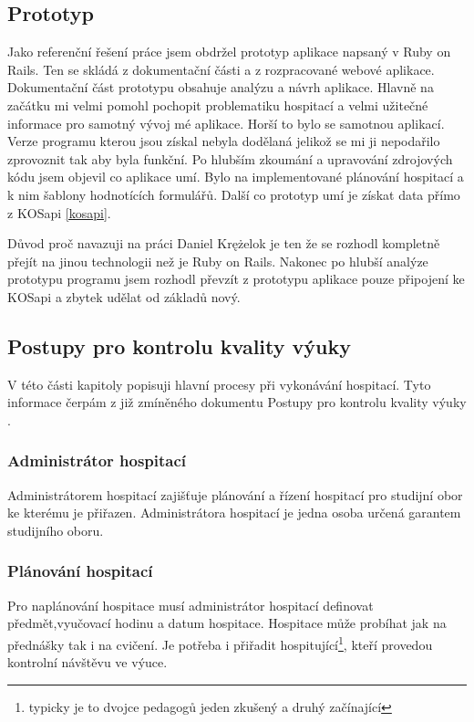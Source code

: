 \subsection{Prototyp}

Jako referenční řešení práce jsem obdržel prototyp aplikace napsaný v Ruby on Rails. Ten se skládá z dokumentační části a z rozpracované webové aplikace. Dokumentační část prototypu obsahuje analýzu a návrh aplikace. Hlavně na začátku mi velmi pomohl pochopit problematiku hospitací a velmi užitečné informace pro samotný vývoj mé aplikace. Horší to bylo se samotnou aplikací. Verze programu kterou jsou získal nebyla dodělaná jelikož se mi ji nepodařilo zprovoznit tak aby byla funkční. Po hlubším zkoumání a upravování zdrojových kódu jsem objevil co aplikace umí. Bylo na implementované plánování hospitací a k nim šablony hodnotících formulářů. Další co prototyp umí je získat data přímo z KOSapi \ref{kosapi}. 

Důvod proč navazuji na práci Daniel Krężelok je ten že se rozhodl kompletně přejít na jinou technologii než je Ruby on Rails. Nakonec po hlubší analýze prototypu programu jsem rozhodl převzít z prototypu aplikace pouze připojení ke KOSapi a zbytek udělat od základů nový. 

\subsection{Postupy pro kontrolu kvality výuky}
V této části kapitoly popisuji hlavní procesy při vykonávání hospitací. Tyto informace čerpám z již zmíněného dokumentu Postupy pro kontrolu kvality výuky \cite{postupy}.

\subsubsection{Administrátor hospitací}
Administrátorem hospitací zajišťuje plánování a řízení hospitací pro studijní obor ke kterému je přiřazen. Administrátora hospitací je jedna osoba určená garantem studijního oboru.

\subsubsection{Plánování hospitací}
Pro naplánování hospitace musí administrátor hospitací definovat předmět,vyučovací hodinu a datum hospitace. Hospitace může probíhat jak na přednášky tak i na cvičení. Je potřeba i přiřadit hospitující\footnote{typicky je to dvojce pedagogů jeden zkušený a druhý začínající}, kteří provedou kontrolní návštěvu ve výuce.

